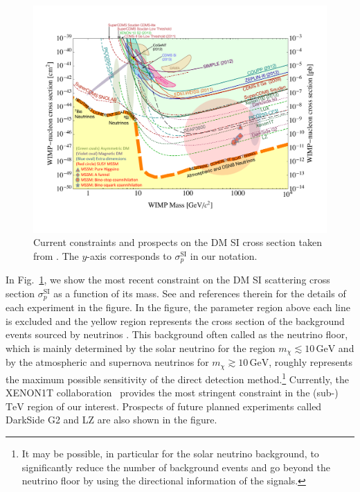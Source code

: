 \documentclass[12pt,twoside,book]{article}
\begin{document}
\begin{figure}[t]
  \centering
  \includegraphics[width=0.8\hsize]{SNOWMASS_LimitPlot_SI_v3.pdf}
  \caption{
    Current constraints and prospects on the DM SI cross section taken from \cite{Cushman:2013zza}.
    The $y$-axis corresponds to $\sigma_p^{\mathrm{SI}}$ in our notation.
  }
  \label{fig:XENON1T}
\end{figure}

In Fig.~\ref{fig:XENON1T}, we show the most recent constraint on the DM SI scattering cross section $\sigma_p^{\mathrm{SI}}$ as a function of its mass.
See \cite{Cushman:2013zza} and references therein for the details of each experiment in the figure.
In the figure, the parameter region above each line is excluded and the yellow region represents the cross section of the background events sourced by neutrinos \cite{Billard:2013qya}.
This background often called as the neutrino floor, which is mainly determined by the solar neutrino for the region $m_\chi \lesssim 10\,\mathrm{GeV}$ and by the atmospheric and supernova neutrinos for $m_\chi \gtrsim 10\,\mathrm{GeV}$, roughly represents the maximum possible sensitivity of the direct detection method.\footnote{
  It may be possible, in particular for the solar neutrino background, to significantly reduce the number of background events and go beyond the neutrino floor by using the directional information of the signals.
}
Currently, the XENON1T collaboration~\cite{Aprile:2018dbl} provides the most stringent constraint in the (sub-)$\text{TeV}$ region of our interest.
Prospects of future planned experiments called DarkSide G2 \cite{Aalseth:2015mba} and LZ \cite{Mount:2017qzi} are also shown in the figure.
\end{document}
